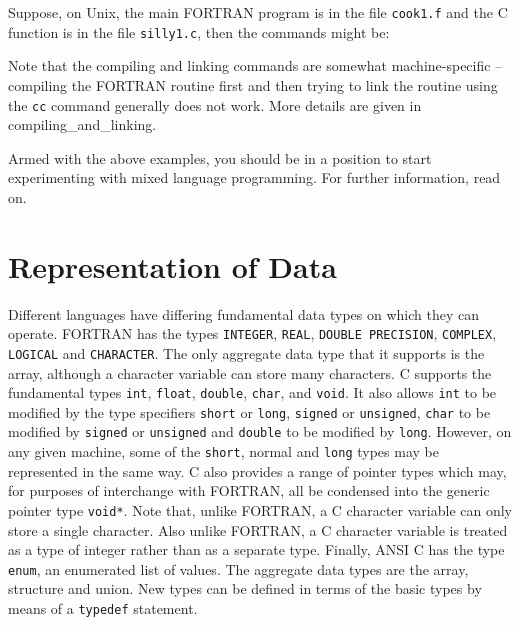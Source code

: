 \documentclass[twoside,11pt,nolof]{starlink}
\newcounter{examples}
\begin{document}
Suppose, on Unix, the main FORTRAN program is in the file \texttt{cook1.f} and
the C function is in the file \texttt{silly1.c}, then the commands might be:

\begin{terminalv}
\end{terminalv}

Note that the compiling and linking commands are somewhat machine-specific
-- compiling the FORTRAN routine first and then trying to link the routine
using the \texttt{cc} command generally does not work.
More details are given in
{compiling_and_linking}.

Armed with the above examples, you should be in a position to start
experimenting with mixed language programming. For further information, read
on.

\section{Representation of Data}

Different languages have differing fundamental data types on which they can
operate. FORTRAN has the types \texttt{INTEGER}, \texttt{REAL},
\texttt{DOUBLE  PRECISION}, \texttt{COMPLEX}, \texttt{LOGICAL} and
\texttt{CHARACTER}\@. The only aggregate data type that it supports is the
array, although a character variable can store many characters. C supports the
fundamental types \texttt{int}, \texttt{float}, \texttt{double}, \texttt{char},
and \texttt{void}. It also allows \texttt{int} to be modified by the type
specifiers \texttt{short} or \texttt{long}, \texttt{signed} or
\texttt{unsigned}, \texttt{char} to be modified
by \texttt{signed} or \texttt{unsigned} and \texttt{double} to be modified by
\texttt{long}. However, on any given machine, some of the \texttt{short},
normal and \texttt{long} types may be represented in the same way.
C also provides a range of pointer types which may, for purposes of
interchange with FORTRAN, all be condensed into the generic pointer
type \texttt{void*}.
Note that, unlike FORTRAN, a C character variable can only store a single
character.
Also unlike FORTRAN, a C
character variable is treated as a type of integer rather than as a separate
type. Finally, ANSI C has the type \texttt{enum}, an enumerated list of values.
The aggregate data types are the array, structure and union. New types can be
defined in terms of the basic types by means of a \texttt{typedef} statement.
\end{document}
